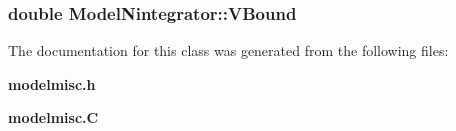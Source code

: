 \subsubsection{\setlength{\rightskip}{0pt plus 5cm}double Model\-Nintegrator::VBound}\label{classModelNintegrator_m1}




The documentation for this class was generated from the following files:\begin{CompactItemize}
\item 
{\bf modelmisc.h}\item 
{\bf modelmisc.C}\end{CompactItemize}

